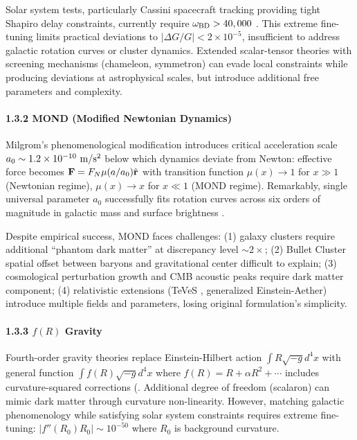 \documentclass[10pt,a4paper]{article}
\begin{document}
Solar system tests, particularly Cassini spacecraft tracking providing
tight Shapiro delay constraints, currently require
\(\omega_{\rm BD} > 40,000\) \cite{Bertotti2003}. This extreme fine-tuning
limits practical deviations to \(|\Delta G/G| < 2 \times 10^{-5}\),
insufficient to address galactic rotation curves or cluster dynamics.
Extended scalar-tensor theories with screening mechanisms (chameleon,
symmetron) can evade local constraints while producing deviations at
astrophysical scales, but introduce additional free parameters and
complexity.

\paragraph{1.3.2 MOND (Modified Newtonian
Dynamics)}\label{mond-modified-newtonian-dynamics}

Milgrom's phenomenological modification \cite{Milgrom1983} introduces critical
acceleration scale \(a_0 \sim 1.2 \times 10^{-10}~{\rm m/s^2}\) below
which dynamics deviate from Newton: effective force becomes
\({\bf F} = F_N \mu(a/a_0)\hat{{\bf r}}\) with transition function
\(\mu(x) \to 1\) for \(x \gg 1\) (Newtonian regime), \(\mu(x) \to x\)
for \(x \ll 1\) (MOND regime). Remarkably, single universal parameter
\(a_0\) successfully fits rotation curves across six orders of magnitude
in galactic mass and surface brightness \cite{Famaey2012}.

Despite empirical success, MOND faces challenges: (1) galaxy clusters
require additional ``phantom dark matter'' at discrepancy level
\(\sim 2\times\); (2) Bullet Cluster spatial offset between baryons and
gravitational center difficult to explain; (3) cosmological perturbation
growth and CMB acoustic peaks require dark matter component; (4)
relativistic extensions (TeVeS \cite{Bekenstein2004}, generalized Einstein-Aether) introduce
multiple fields and parameters, losing original formulation's
simplicity.

\paragraph{\texorpdfstring{1.3.3 \(f(R)\)
Gravity}{1.3.3 f(R) Gravity}}\label{fr-gravity}

Fourth-order gravity theories replace Einstein-Hilbert action
\(\int R\sqrt{-g}d^4x\) with general function \(\int f(R)\sqrt{-g}d^4x\)
where \(f(R) = R + \alpha R^2 + \cdots\) includes curvature-squared
corrections (\cite{Sotiriou2010}. Additional degree of freedom
(scalaron) can mimic dark matter through curvature non-linearity.
However, matching galactic phenomenology while satisfying solar system
constraints requires extreme fine-tuning:
\(|f''(R_0)R_0| \sim 10^{-50}\) where \(R_0\) is background curvature.
\end{document}
